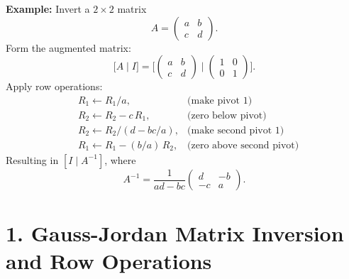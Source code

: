 \documentclass[12pt, a4paper]{report}
\begin{document}
\textbf{Example:} Invert a $2\times2$ matrix
$$
A = \begin{pmatrix}a & b \\ c & d\end{pmatrix}.
$$
Form the augmented matrix:
$$
\bigl[A\mid I\bigr] = \bigl[\begin{pmatrix}a & b \\ c & d\end{pmatrix}\mid \begin{pmatrix}1 & 0 \\ 0 & 1\end{pmatrix}\bigr].
$$
Apply row operations:
\begin{align*}
& R_1 \leftarrow R_1 / a,  &\text{(make pivot $1$)}\\
& R_2 \leftarrow R_2 - c\,R_1,      &\text{(zero below pivot)}\\
& R_2 \leftarrow R_2 / (d - bc/a), &\text{(make second pivot $1$)}\\
& R_1 \leftarrow R_1 - (b/a)\,R_2,  &\text{(zero above second pivot)}
\end{align*}
Resulting in $[I\mid A^{-1}]$, where
$$
A^{-1} = \frac{1}{ad - bc} \begin{pmatrix} d & -b \\ -c & a \end{pmatrix}.
$$


\section*{1. Gauss-Jordan Matrix Inversion and Row Operations}
\end{document}
